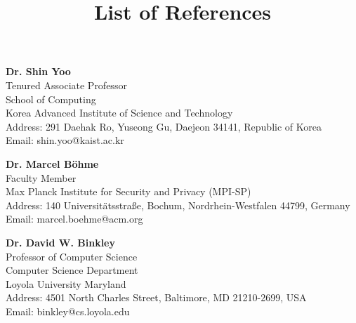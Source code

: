 \documentclass{article}
\title{\raggedright List of References}
\date{}
\begin{document}
\maketitle


\begin{enumerate}[label={[\arabic*]}]
    \item \textbf{Dr. Shin Yoo} \\
    Tenured Associate Professor \\
    School of Computing \\
    Korea Advanced Institute of Science and Technology \\
    Address: 291 Daehak Ro, Yuseong Gu, Daejeon 34141, Republic of Korea \\
    Email: shin.yoo@kaist.ac.kr
    \item \textbf{Dr. Marcel B{\"o}hme} \\
    Faculty Member \\
    Max Planck Institute for Security and Privacy (MPI-SP) \\
    Address: 140 Universit{\"a}tsstra{\ss}e, Bochum, Nordrhein-Westfalen 44799, Germany \\
    Email: marcel.boehme@acm.org
    \item \textbf{Dr. David W. Binkley} \\
    Professor of Computer Science \\
    Computer Science Department \\
    Loyola University Maryland \\
    Address: 4501 North Charles Street, Baltimore, MD 21210-2699, USA \\
    Email: binkley@cs.loyola.edu
\end{enumerate}
\end{document}
